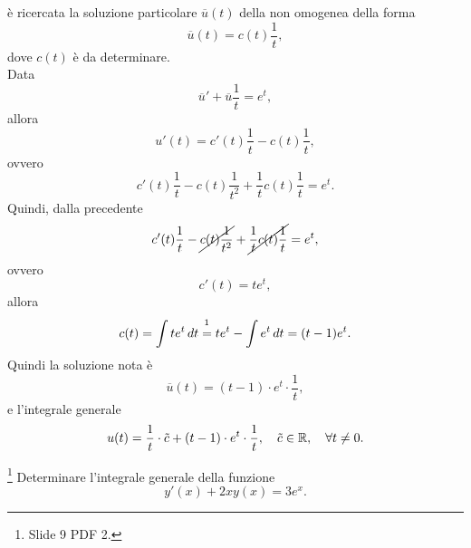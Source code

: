 \begin{example}
\begin{equation*}
    \end{equation*}
    è ricercata la soluzione particolare $\overline{u}(t)$ della non omogenea della forma
    \begin{equation*}
        \overline{u}(t)=c(t)\frac{1}{t},
    \end{equation*}
    dove $c(t)$ è da determinare.\\
    Data
    \begin{equation*}
        \overline{u}'+\overline{u}\frac{1}{t}=e^t,
    \end{equation*}
    allora
    \begin{equation*}
        u'(t)=c'(t)\frac{1}{t}-c(t)\frac{1}{t},
    \end{equation*}
    ovvero
    \begin{equation*}
        c'(t)\frac{1}{t}-c(t)\frac{1}{t^2}+\frac{1}{t}c(t)\frac{1}{t}=e^t.
    \end{equation*}
    Quindi, dalla precedente
    \begin{equation*}
        c'(t)\frac{1}{t}-\cancel{c(t)\frac{1}{t^2}} + \cancel{\frac{1}{t}c(t)\frac{1}{t}} = e^t,
    \end{equation*}
    ovvero
    \begin{equation*}
        c'(t)=te^t,
    \end{equation*}
    allora
    \begin{equation*}
        c(t)=\int te^t\, dt\overset{\footnotemark}{=}te^t-\int e^t\, dt=(t-1)e^t.
    \end{equation*}
    Quindi la soluzione nota è
    \begin{equation*}
        \overline{u}(t)=(t-1)\cdot e^t\cdot\frac{1}{t},
    \end{equation*}
    e l'integrale generale
    \begin{equation*}
        u(t)=\frac{1}{t}\cdot\Tilde{c}+(t-1)\cdot e^t\cdot\frac{1}{t},\quad\Tilde{c}\in\mathbb R,\quad\forall t\neq 0.
    \end{equation*}
\end{example}

\begin{exercise}\footnote{Slide 9 PDF 2.}
    Determinare l'integrale generale della funzione
    \begin{equation*}
        y'(x)+2xy(x)=3e^x.
    \end{equation*}
\end{exercise}

